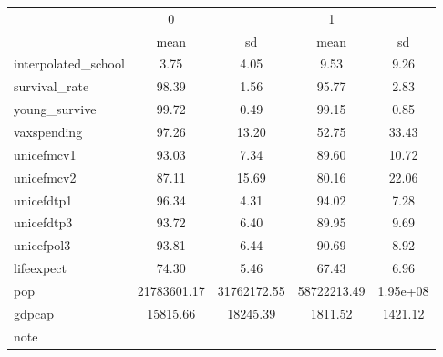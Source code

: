 \begin{tabular}{l*{2}{cc}}
\hline\hline
            &           0&            &           1&            \\
            &        mean&          sd&        mean&          sd\\
\hline
interpolated\_school&        3.75&        4.05&        9.53&        9.26\\
survival\_rate&       98.39&        1.56&       95.77&        2.83\\
young\_survive&       99.72&        0.49&       99.15&        0.85\\
vaxspending &       97.26&       13.20&       52.75&       33.43\\
unicefmcv1  &       93.03&        7.34&       89.60&       10.72\\
unicefmcv2  &       87.11&       15.69&       80.16&       22.06\\
unicefdtp1  &       96.34&        4.31&       94.02&        7.28\\
unicefdtp3  &       93.72&        6.40&       89.95&        9.69\\
unicefpol3  &       93.81&        6.44&       90.69&        8.92\\
lifeexpect  &       74.30&        5.46&       67.43&        6.96\\
pop         & 21783601.17& 31762172.55& 58722213.49&    1.95e+08\\
gdpcap      &    15815.66&    18245.39&     1811.52&     1421.12\\
\hline\hline
\multicolumn{5}{l}{\footnotesize note}\\
\end{tabular}
